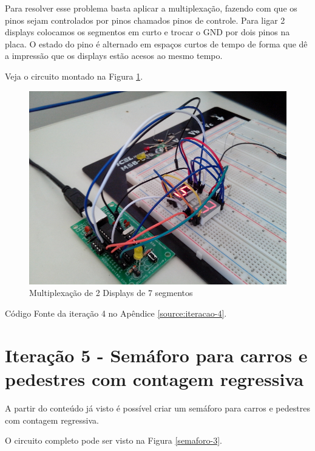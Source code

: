 Para resolver esse problema basta aplicar a multiplexação, fazendo com
que os pinos sejam controlados por pinos chamados pinos de controle.
Para ligar 2 displays colocamos os segmentos em curto e trocar o GND por
dois pinos na placa. O estado do pino é alternado em espaços curtos de
tempo de forma que dê a impressão que os displays estão acesos ao mesmo
tempo.

Veja o circuito montado na Figura \ref{fig:display-7seg-2}.

\begin{figure}[H]
    \includegraphics[scale=0.5]{img/display-7seg-2.jpg}
    \caption{Multiplexação de 2 Displays de 7 segmentos} \label{fig:display-7seg-2}
\end{figure}

Código Fonte da iteração 4 no Apêndice \ref{source:iteracao-4}.

\section{Iteração 5 - Semáforo para carros e pedestres com contagem
regressiva}\label{iterauxe7uxe3o-5---semuxe1foro-para-carros-e-pedestres-com-contagem-regressiva}

A partir do conteúdo já visto é possível criar um semáforo para carros e
pedestres com contagem regressiva.

O circuito completo pode ser visto na Figura \ref{semaforo-3}.

